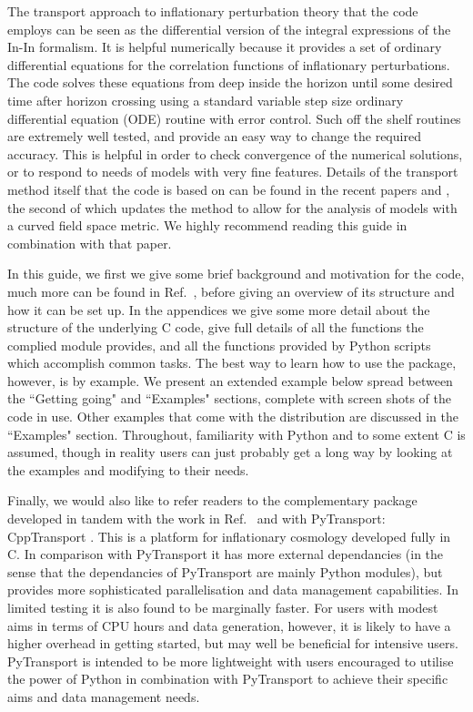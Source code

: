 \documentclass[10pt,
amsmath,amssymb,
aps,prd,nofootinbib,eqsecnum,a4paper]{revtex4}
\newcommand{\CC}{C\nolinebreak\hspace{-.05em}\raisebox{.4ex}{\tiny\bf +}\nolinebreak\hspace{-.10em}\raisebox{.4ex}{\tiny\bf +}}
\def\CC{{C\nolinebreak[4]\hspace{-.05em}\raisebox{.4ex}{\tiny\bf ++}}}
\def\S{ }
\begin{document}
The transport approach to inflationary perturbation theory that the code employs 
can be seen as the differential version of the integral expressions of the In-In formalism. It 
is helpful numerically because it provides a set of ordinary differential equations for the correlation functions  
of inflationary perturbations. The code solves these equations from deep inside the horizon until some desired time 
after horizon crossing using a standard variable step size ordinary differential equation (ODE) 
routine with error control. Such off the shelf 
routines are extremely well tested, and provide
an easy way to change the required accuracy. This is helpful in order to check convergence of the numerical 
solutions, or to respond to needs of models with very fine features. 
Details of the transport method itself that the code is based on can be found in the recent papers \cite{xxx} 
and \cite{xxx2}, the second of which updates the method to allow
for the analysis of models with a curved field space metric. We 
highly recommend reading this guide in combination with that paper.



In this guide, we first we give some brief background and motivation for the code, much more can be found in Ref.~\cite{xxx}, 
before giving an overview of its structure and how 
it can be set up. In the appendices we give some more detail about the structure of the underlying \CC \S code,  
give full details of all the functions the complied module provides, and all the functions provided by 
Python scripts which accomplish common tasks. The best way to learn how to use the package, however, is 
by example. We present an extended example below spread between the ``Getting going"  and ``Examples" sections, 
complete with screen shots of the code in use. 
Other examples that come with the distribution are discussed in the ``Examples" section.
Throughout, familiarity with Python and to some extent \CC \S  is assumed, though in reality users 
can just probably get a long way by looking at the examples and modifying to their needs. 



Finally, we would also like to refer readers to the complementary package developed 
in tandem with the work in Ref.~\cite{xxx} and with PyTransport: CppTransport \cite{xxx2}. This is a platform for inflationary 
cosmology developed fully in \CC. In comparison with PyTransport it  has 
more external dependancies (in the sense that the dependancies of PyTransport are mainly 
Python modules), but provides more sophisticated parallelisation and data management capabilities. 
In limited testing it is also found to be marginally faster.
For users with modest aims in terms of CPU hours and data generation, however, it is likely to have a higher 
overhead 
in getting started, but may well be beneficial for intensive users. PyTransport 
is intended to be more lightweight with users encouraged to utilise the power of Python in combination 
with PyTransport to achieve their specific aims and data management needs.
\end{document}
